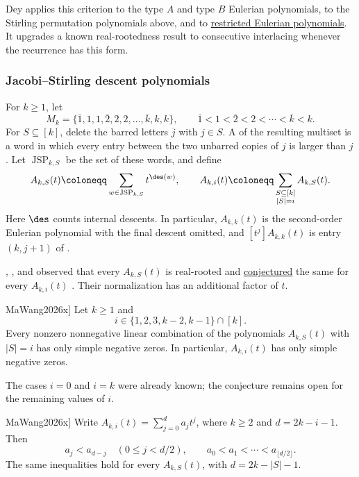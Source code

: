Dey applies this criterion to the type $A$ and type $B$ Eulerian
polynomials, to the Stirling permutation polynomials above, and to
\hyperref[restrictedEulerianPolynomial]{restricted Eulerian polynomials}.
It upgrades a known real-rootedness result to consecutive interlacing
whenever the recurrence has this form.


\subsubsection[jacobiStirlingDescentRealRooted]{Jacobi--Stirling descent polynomials}

For $k\geq1$, let
\[
 M_k=\{\overline{1},1,1,\overline{2},2,2,\dotsc,\overline{k},k,k\},
 \qquad
 \overline{1}<1<\overline{2}<2<\dotsb<\overline{k}<k.
\]
For $S\subseteq[k]$, delete the barred letters $\overline{j}$ with $j\in S$.
A  of the resulting multiset is a word
in which every entry between the two unbarred copies of $j$ is larger than
$j$.  Let $\operatorname{JSP}_{k,S}$ be the set of these words, and define
\[
 A_{k,S}(t)\coloneqq\sum_{w\in\operatorname{JSP}_{k,S}}t^{\des(w)},
 \qquad
 A_{k,i}(t)\coloneqq
 \sum_{\substack{S\subseteq[k]\\|S|=i}}A_{k,S}(t).
\]
Here $\des$ counts internal descents.  In particular, $A_{k,k}(t)$ is the
second-order Eulerian polynomial with the final descent omitted, and
$[t^j]A_{k,k}(t)$ is entry $(k,j+1)$ of .

, , and  observed that
every $A_{k,S}(t)$ is real-rooted and
\hyperref[conjJacobiStirling]{conjectured} the same for every
$A_{k,i}(t)$ \cite[Sec.~5 and Conj.~15]{GesselLinZeng2012}.  Their
normalization has an additional factor of $t$.

\begin{theorem*}[\name{Shi-Mei Ma} and \name{Ming-Xin Wang},
\cite[Thm.~2 and Cor.~2]{MaWang2026x}]
Let $k\geq1$ and
\[
 i\in\{1,2,3,k-2,k-1\}\cap[k].
\]
Every nonzero nonnegative linear combination of the polynomials
$A_{k,S}(t)$ with $|S|=i$ has only simple negative zeros.  In particular,
$A_{k,i}(t)$ has only simple negative zeros.
\end{theorem*}

The cases $i=0$ and $i=k$ were already known; the conjecture remains open
for the remaining values of $i$.

\begin{theorem*}[\cite[Thms.~3 and 5]{MaWang2026x}]
Write $A_{k,i}(t)=\sum_{j=0}^{d}a_jt^j$, where $k\geq2$ and
$d=2k-i-1$.  Then
\[
 a_j<a_{d-j}\quad(0\leq j<d/2),
 \qquad
 a_0<a_1<\dotsb<a_{\lfloor d/2\rfloor}.
\]
The same inequalities hold for every $A_{k,S}(t)$, with
$d=2k-|S|-1$.
\end{theorem*}

